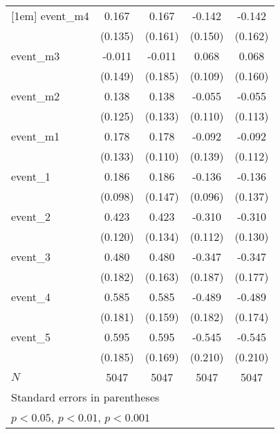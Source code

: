 {\begin{tabular}{l*{4}{c}}
[1em]
event\_m4    &       0.167         &       0.167         &      -0.142         &      -0.142         \\
            &     (0.135)         &     (0.161)         &     (0.150)         &     (0.162)         \\
[1em]
event\_m3    &      -0.011         &      -0.011         &       0.068         &       0.068         \\
            &     (0.149)         &     (0.185)         &     (0.109)         &     (0.160)         \\
[1em]
event\_m2    &       0.138         &       0.138         &      -0.055         &      -0.055         \\
            &     (0.125)         &     (0.133)         &     (0.110)         &     (0.113)         \\
[1em]
event\_m1    &       0.178         &       0.178         &      -0.092         &      -0.092         \\
            &     (0.133)         &     (0.110)         &     (0.139)         &     (0.112)         \\
[1em]
event\_1     &       0.186         &       0.186         &      -0.136         &      -0.136         \\
            &     (0.098)         &     (0.147)         &     (0.096)         &     (0.137)         \\
[1em]
event\_2     &       0.423\sym{***}&       0.423\sym{**} &      -0.310\sym{**} &      -0.310\sym{*}  \\
            &     (0.120)         &     (0.134)         &     (0.112)         &     (0.130)         \\
[1em]
event\_3     &       0.480\sym{**} &       0.480\sym{**} &      -0.347         &      -0.347\sym{*}  \\
            &     (0.182)         &     (0.163)         &     (0.187)         &     (0.177)         \\
[1em]
event\_4     &       0.585\sym{**} &       0.585\sym{***}&      -0.489\sym{**} &      -0.489\sym{**} \\
            &     (0.181)         &     (0.159)         &     (0.182)         &     (0.174)         \\
[1em]
event\_5     &       0.595\sym{**} &       0.595\sym{***}&      -0.545\sym{**} &      -0.545\sym{**} \\
            &     (0.185)         &     (0.169)         &     (0.210)         &     (0.210)         \\
\hline
\(N\)       &        5047         &        5047         &        5047         &        5047         \\
\hline\hline
\multicolumn{5}{l}{\footnotesize Standard errors in parentheses}\\
\multicolumn{5}{l}{\footnotesize \sym{*} \(p<0.05\), \sym{**} \(p<0.01\), \sym{***} \(p<0.001\)}\\
\end{tabular}
}
